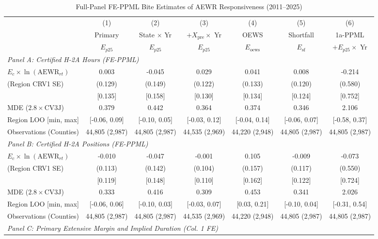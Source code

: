 \begin{table}[!htbp]
\centering
\caption{Full-Panel FE-PPML Bite Estimates of AEWR Responsiveness (2011--2025)}
\label{tab:bite_main}
\small
\begin{tabular}{lcccccc}
\toprule
 & (1) & (2) & (3) & (4) & (5) & (6) \\
 & Primary & State $\times$ Yr & $+X_{\text{pre}} \times$ Yr & OEWS & Shortfall & 1a-PPML \\
 & $E_{p25}$ & $E_{p25}$ & $E_{p25}$ & $E_{\text{oews}}$ & $E_{\text{sf}}$ & $+E_{p25} \times$ Yr \\
\midrule
\multicolumn{7}{l}{\textit{Panel A: Certified H-2A Hours (FE-PPML)}} \\
$E_c \times \ln(\text{AEWR}_{rt})$ & 0.003 & -0.045 & 0.029 & 0.041 & 0.008 & -0.214 \\
\quad (Region CRV1 SE) & (0.129) & (0.149) & (0.122) & (0.133) & (0.120) & (0.580) \\
\quad [Region CV3J SE] & [0.135] & [0.158] & [0.130] & [0.134] & [0.124] & [0.752] \\
\quad MDE ($2.8 \times \text{CV3J}$) & 0.379 & 0.442 & 0.364 & 0.374 & 0.346 & 2.106 \\
\quad Region LOO [min, max] & [-0.06, 0.09] & [-0.10, 0.05] & [-0.03, 0.12] & [-0.04, 0.14] & [-0.06, 0.07] & [-0.58, 0.37] \\
\quad Observations (Counties) & 44,805 (2,987) & 44,805 (2,987) & 44,535 (2,969) & 44,220 (2,948) & 44,805 (2,987) & 44,805 (2,987) \\
\midrule
\multicolumn{7}{l}{\textit{Panel B: Certified H-2A Positions (FE-PPML)}} \\
$E_c \times \ln(\text{AEWR}_{rt})$ & -0.010 & -0.047 & -0.001 & 0.105 & -0.009 & -0.073 \\
\quad (Region CRV1 SE) & (0.113) & (0.142) & (0.104) & (0.157) & (0.117) & (0.550) \\
\quad [Region CV3J SE] & [0.119] & [0.148] & [0.110] & [0.162] & [0.122] & [0.724] \\
\quad MDE ($2.8 \times \text{CV3J}$) & 0.333 & 0.416 & 0.309 & 0.453 & 0.341 & 2.026 \\
\quad Region LOO [min, max] & [-0.06, 0.06] & [-0.10, 0.03] & [-0.03, 0.07] & [0.03, 0.21] & [-0.10, 0.04] & [-0.31, 0.54] \\
\quad Observations (Counties) & 44,805 (2,987) & 44,805 (2,987) & 44,535 (2,969) & 44,220 (2,948) & 44,805 (2,987) & 44,805 (2,987) \\
\midrule
\multicolumn{7}{l}{\textit{Panel C: Primary Extensive Margin and Implied Duration (Col. 1 FE)}} \\

\end{tabular}
\end{table}
